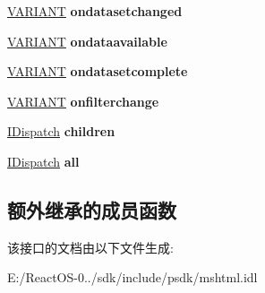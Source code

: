 \begin{DoxyCompactItemize}
\item 
\mbox{\label{interface_m_s_h_t_m_l_1_1_i_h_t_m_l_element_a89d142183e69e70fa78a0a27fc035f04}} 
\hyperlink{structtag_v_a_r_i_a_n_t}{V\+A\+R\+I\+A\+NT} {\bfseries ondatasetchanged}
\item 
\mbox{\label{interface_m_s_h_t_m_l_1_1_i_h_t_m_l_element_ae592d818f4d56b05e578b8903795bba6}} 
\hyperlink{structtag_v_a_r_i_a_n_t}{V\+A\+R\+I\+A\+NT} {\bfseries ondataavailable}
\item 
\mbox{\label{interface_m_s_h_t_m_l_1_1_i_h_t_m_l_element_a3569642712f93a873d9c2532db07d17f}} 
\hyperlink{structtag_v_a_r_i_a_n_t}{V\+A\+R\+I\+A\+NT} {\bfseries ondatasetcomplete}
\item 
\mbox{\label{interface_m_s_h_t_m_l_1_1_i_h_t_m_l_element_a751ecac66fc28e5bf7420146b4ab8783}} 
\hyperlink{structtag_v_a_r_i_a_n_t}{V\+A\+R\+I\+A\+NT} {\bfseries onfilterchange}
\item 
\mbox{\label{interface_m_s_h_t_m_l_1_1_i_h_t_m_l_element_a44dc17bd377fae5c5c6564b8b61a8a85}} 
\hyperlink{interface_i_dispatch}{I\+Dispatch} {\bfseries children}
\item 
\mbox{\label{interface_m_s_h_t_m_l_1_1_i_h_t_m_l_element_ab6bc1a64674daec77fd8803d92a8225e}} 
\hyperlink{interface_i_dispatch}{I\+Dispatch} {\bfseries all}
\end{DoxyCompactItemize}
\subsection*{额外继承的成员函数}


该接口的文档由以下文件生成\+:\begin{DoxyCompactItemize}
\item 
E\+:/\+React\+O\+S-\/0../sdk/include/psdk/mshtml.\+idl\end{DoxyCompactItemize}

